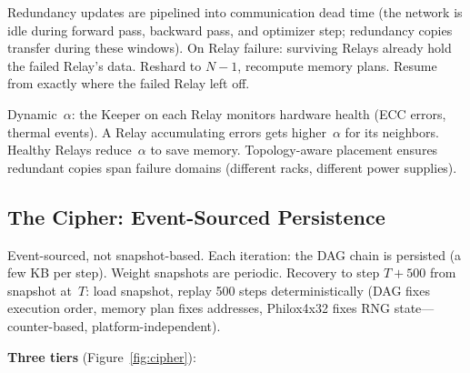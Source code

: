 Redundancy updates are pipelined into communication dead time (the network is idle during forward pass, backward pass, and optimizer step; redundancy copies transfer during these windows).
On Relay failure: surviving Relays already hold the failed Relay's data.
Reshard to $N{-}1$, recompute memory plans.
Resume from exactly where the failed Relay left off.

Dynamic~$\alpha$: the Keeper on each Relay monitors hardware health (ECC errors, thermal events).
A Relay accumulating errors gets higher~$\alpha$ for its neighbors.
Healthy Relays reduce~$\alpha$ to save memory.
Topology-aware placement ensures redundant copies span failure domains (different racks, different power supplies).

\subsection{The Cipher: Event-Sourced Persistence}

Event-sourced, not snapshot-based.
Each iteration: the DAG chain is persisted (a few KB per step).
Weight snapshots are periodic.
Recovery to step $T{+}500$ from snapshot at~$T$: load snapshot, replay 500 steps deterministically (DAG fixes execution order, memory plan fixes addresses, Philox4x32 fixes RNG state---counter-based, platform-independent).

\textbf{Three tiers} (Figure~\ref{fig:cipher}):

